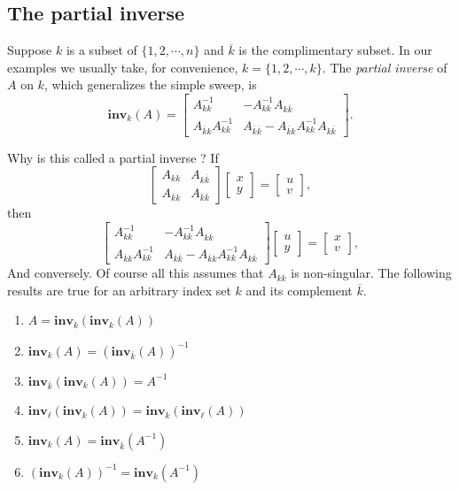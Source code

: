 \documentclass[]{article}
\providecommand{\tightlist}{%
  \setlength{\itemsep}{0pt}\setlength{\parskip}{0pt}}
\begin{document}
\subsection{The partial inverse}\label{the-partial-inverse}

Suppose \(k\) is a subset of \(\{1,2,\cdots,n\}\) and \(\overline{k}\)
is the complimentary subset. In our examples we usually take, for
convenience, \(k=\{1,2,\cdots,k\}\). The \emph{partial inverse} of \(A\)
on \(k\), which generalizes the simple sweep, is \[
\mathbf{inv}_k(A)=\begin{bmatrix}
A_{kk}^{-1}&-A_{kk}^{-1}A_{k\overline{k}}\\
A_{\overline k k}A_{kk}^{-1}&A_{\overline k\overline k}-A_{\overline k k}A_{kk}^{-1}A_{k\overline{k}}
\end{bmatrix}.
\]

Why is this called a partial inverse ? If \[
\begin{bmatrix}
A_{kk}&A_{k\overline k}\\
A_{\overline k k}&A_{\overline k\overline k}
\end{bmatrix}
\begin{bmatrix}
x\\y
\end{bmatrix}=
\begin{bmatrix}
u\\v
\end{bmatrix},
\] then \[
\begin{bmatrix}
A_{kk}^{-1}&-A_{kk}^{-1}A_{k\overline{k}}\\
A_{\overline k k}A_{kk}^{-1}&A_{\overline k\overline k}-A_{\overline k k}A_{kk}^{-1}A_{k\overline{k}}
\end{bmatrix}
\begin{bmatrix}
u\\y
\end{bmatrix}=
\begin{bmatrix}
x\\v
\end{bmatrix},
\] And conversely. Of course all this assumes that \(A_{kk}\) is
non-singular. The following results are true for an arbitrary index set
\(k\) and its complement \(\overline k\).

\begin{enumerate}
\def\labelenumi{\arabic{enumi}.}
\tightlist
\item
  \(A=\mathbf{inv}_k(\mathbf{inv}_k(A))\)
\item
  \(\mathbf{inv}_k(A)=(\mathbf{inv}_{\overline k}(A))^{-1}\)
\item
  \(\mathbf{inv}_{\overline k}(\mathbf{inv}_k(A))=A^{-1}\)
\item
  \(\mathbf{inv}_{\ell}(\mathbf{inv}_k(A))=\mathbf{inv}_{k}(\mathbf{inv}_\ell(A))\)
\item
  \(\mathbf{inv}_{k}(A)=\mathbf{inv}_{\overline k}(A^{-1})\)
\item
  \((\mathbf{inv}_{k}(A))^{-1}=\mathbf{inv}_{k}(A^{-1})\)
\end{enumerate}
\end{document}
